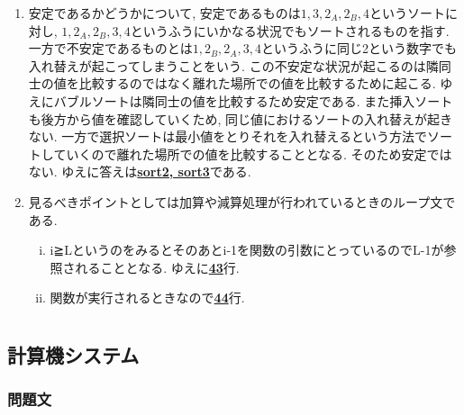 \documentclass[dvipdfmx,titlepage, 11pt, a4paper]{jsarticle}%
\begin{document}
\begin{enumerate}[(1)]
\begin{enumerate}[({3}$-$a)]
  \item 安定であるかどうかについて, 安定であるものは$1,3,2_{A},2_{B},4$というソートに対し, $1,2_{A},2_{B},3,4$というふうにいかなる状況でもソートされるものを指す. 一方で不安定であるものとは$1,2_{B},2_{A},3,4$というふうに同じ2という数字でも入れ替えが起こってしまうことをいう. この不安定な状況が起こるのは隣同士の値を比較するのではなく離れた場所での値を比較するために起こる. ゆえにバブルソートは隣同士の値を比較するため安定である. また挿入ソートも後方から値を確認していくため, 同じ値におけるソートの入れ替えが起きない. 一方で選択ソートは最小値をとりそれを入れ替えるという方法でソートしていくので離れた場所での値を比較することとなる. そのため安定ではない. ゆえに答えは\underline{\bf sort2, sort3}である.
  \item 見るべきポイントとしては加算や減算処理が行われているときのループ文である.
    \begin{enumerate}[i)]
    \item i≧Lというのをみるとそのあとi-1を関数の引数にとっているのでL-1が参照されることとなる. ゆえに\underline{\bf 43}行.
    \item 関数が実行されるときなので\underline{\bf 44}行.
    \end{enumerate}
  \end{enumerate}
\end{enumerate}
\newpage

\section{}
\subsection{計算機システム}
\subsubsection{問題文}
\vspace{0.6cm}

\begin{center}
\end{center}
\end{document}
